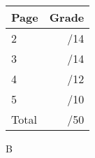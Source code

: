\documentclass[12pt]{article}
\newcommand{\skipline}{\vspace{12pt}}
\begin{document}
\begin{table}[hbt]
\begin{center}
\begin{tabular}{|l|r|} \hline
Page&Grade\\
\hline \hline
\cline{1-2} 2 & \enspace\enspace\enspace\enspace\enspace\enspace/14\\
\cline{1-2} 3 & \enspace\enspace\enspace\enspace\enspace\enspace/14\\
\cline{1-2} 4 & \enspace\enspace\enspace\enspace\enspace\enspace/12\\
\cline{1-2} 5 & \enspace\enspace\enspace\enspace\enspace\enspace/10\\
\cline{1-2} Total & \enspace\enspace\enspace\enspace\enspace\enspace/50\\
\hline
\end{tabular}

\skipline

\skipline

\skipline

B
\end{center}
\end{table}
\newpage
\end{document}
